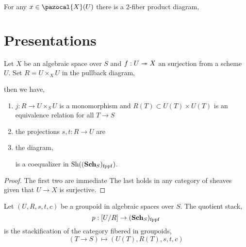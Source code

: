 \documentclass[12pt]{article}
\newcommand{\fppf}{\mathrm{fppf}}
\renewcommand{\X}{\pazocal{X}}
\begin{document}
\begin{prop}
For any $x \in \X(U)$ there is a $2$-fiber product diagram,
\begin{center}
\end{center}
\end{prop}

\section{Presentations}

\begin{prop}
Let $X$ be an algebraic space over $S$ and $f : U \twoheadrightarrow X$ an \etale surjection from a scheme $U$. Set $R = U \times_X U$ in the pullback diagram,
\begin{center}
\end{center}
then we have,
\begin{enumerate}
\item $j : R \to U \times_S U$ is a monomorphism and $R(T) \subset U(T) \times U(T)$ is an equivalence relation for all $T \to S$
\item the projections $s,t : R \to U$ are \etale
\item the diagram,
\begin{center}
\end{center}
is a coequalizer in $\mathrm{Sh}((\Sch_S)_{\fppf})$. 
\end{enumerate}
\end{prop}

\begin{proof}
The first two are immediate The last holds in any category of sheaves given that $U \to X$ is surjective. 
\end{proof}

\begin{defn}
Let $(U, R, s, t, c)$ be a groupoid in algebraic spaces over $S$. The quotient stack,
\[ p : [U/R] \to (\Sch_S)_{\fppf} \]
is the stackification of the category fibered in groupoids,
\[ (T \to S) \mapsto (U(T), R(T), s, t, c) \]
\end{defn}
\end{document}
